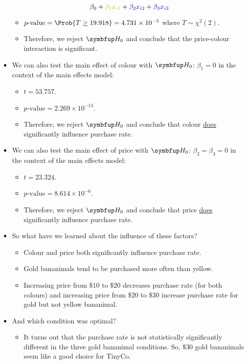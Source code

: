 \begin{itemize}
            \[ \beta_0+{\color{Goldenrod}\beta_1x_{i1}}+{\color{DarkBlue}\beta_2x_{i2}+\beta_3x_{i3}} \]
            \begin{itemize}
                  \item $ p\text{-value}=\Prob{T\ge 19.918}=4.731\times 10^{-5} $ where $ T \sim \chi^2(2) $.
                  \item Therefore, we reject $ \HN $ and conclude that the price-colour interaction is significant.
            \end{itemize}
      \item We can also test the main effect of colour with {\color{Goldenrod}$ \HN $: $ \beta_1=0 $} in the context of the main effects model:
            \begin{itemize}
                  \item $ t=53.757 $.
                  \item $ p\text{-value}=2.269\times 10^{-13} $.
                  \item Therefore, we reject $ \HN $ and conclude that colour \underline{does} significantly influence purchase rate.
            \end{itemize}
      \item We can also test the main effect of price with {\color{DarkBlue}$ \HN $: $ \beta_2=\beta_3=0 $} in the context of the main effects model:
            \begin{itemize}
                  \item $ t=23.324 $.
                  \item $ p\text{-value}=8.614\times 10^{-6} $.
                  \item Therefore, we reject $ \HN $ and conclude that price \underline{does} significantly influence purchase rate.
            \end{itemize}
      \item So what have we learned about the influence of these factors?
            \begin{itemize}
                  \item Colour and price both significantly influence purchase rate.
                  \item Gold bananimals tend to be purchased more often than yellow.
                  \item Increasing price from $ \$10 $ to $ \$20 $ decreases purchase rate (for both colours)
                        and increasing price from $ \$20 $ to $ \$30 $ increase purchase rate for gold but not yellow bananimal.
            \end{itemize}
      \item And which condition was optimal?
            \begin{itemize}
                  \item It turns out that the purchase rate is not statistically significantly different in
                        the three gold bananimal conditions. So, $ \$30 $ gold bananimals seem like a good choice for TinyCo.
            \end{itemize}
\end{itemize}

